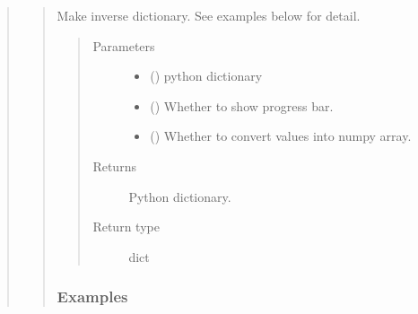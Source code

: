 \documentclass[letterpaper,10pt,english]{sphinxmanual}
\begin{document}
\begin{quote}
\begin{quote}
\begin{fulllineitems}
\label{\detokenize{modules/celloracle.utility:celloracle.utility.inverse_dictionary}}
Make inverse dictionary.
See examples below for detail.
\begin{quote}\begin{description}
\item[{Parameters}] \leavevmode\begin{itemize}
\item {} 
 () \textendash{} python dictionary

\item {} 
 () \textendash{} Whether to show progress bar.

\item {} 
 () \textendash{} Whether to convert values into numpy array.

\end{itemize}

\item[{Returns}] \leavevmode
Python dictionary.

\item[{Return type}] \leavevmode
dict

\end{description}\end{quote}
\subsubsection*{Examples}

\begin{sphinxVerbatim}[commandchars=\\\{\}]
   \PYG{p}{[}  \PYG{p}{]}  \PYG{p}{[}  \PYG{p}{]}
\end{sphinxVerbatim}


\end{fulllineitems}
\end{quote}
\end{quote}
\end{document}
